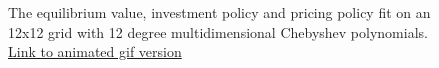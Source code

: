 \documentclass[12pt]{article}
\begin{document}
\begin{figure}[H]
  \centering
  \caption{The equilibrium value, investment policy and pricing policy fit on an 12x12 grid with 12 degree multidimensional Chebyshev polynomials. \href{https://github.com/wmjones/VFA-for-dynamic-games/blob/master/gifs/gif_cai_12_12.gif}{Link to animated gif version}}
  \label{gibbslittle}
\end{figure}
\end{document}
